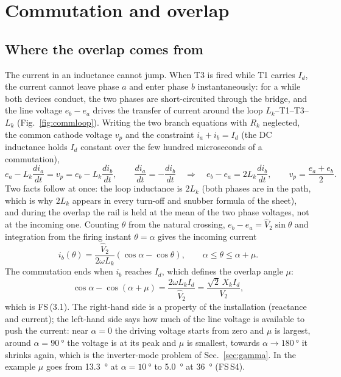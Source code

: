 \documentclass[10pt,a4paper]{scrartcl}
\newcommand{\Id}{I_{d}}
\newcommand{\Vll}{V_{2}}
\newcommand{\Xk}{X_{k}}
\newcommand{\Lk}{L_{k}}
\newcommand{\Rk}{R_{k}}
\newcommand{\fs}[1]{\textsf{FS}\,(#1)}
\newcommand{\fsS}[1]{\textsf{FS}\,#1}
\begin{document}
\section{Commutation and overlap}\label{sec:overlap}
\subsection{Where the overlap comes from}
The current in an inductance cannot jump. When T3 is fired while T1 carries $\Id$, the current cannot leave phase $a$ and enter phase $b$ instantaneously: for a while both devices conduct, the two phases are short-circuited through the bridge, and the line voltage $e_b - e_a$ drives the transfer of current around the loop $\Lk$--T1--T3--$\Lk$ (Fig.~\ref{fig:commloop}). Writing the two branch equations with $\Rk$ neglected, the common cathode voltage $v_p$ and the constraint $i_a + i_b = \Id$ (the DC inductance holds $\Id$ constant over the few hundred microseconds of a commutation),
\begin{equation}
e_a - \Lk\frac{di_a}{dt} = v_p = e_b - \Lk\frac{di_b}{dt}, \qquad \frac{di_a}{dt} = -\frac{di_b}{dt}
\quad\Rightarrow\quad
e_b - e_a = 2\Lk\frac{di_b}{dt}, \qquad v_p = \frac{e_a+e_b}{2} .
\label{eq:commKVL}
\end{equation}
Two facts follow at once: the loop inductance is $2\Lk$ (both phases are in the path, which is why $2\Lk$ appears in every turn-off and snubber formula of the sheet), and during the overlap the rail is held at the mean of the two phase voltages, not at the incoming one. Counting $\theta$ from the natural crossing, $e_b - e_a = \hat V_2\sin\theta$ and integration from the firing instant $\theta = \alpha$ gives the incoming current
\begin{equation}
i_b(\theta) = \frac{\hat V_2}{2\omega\Lk}\left(\cos\alpha - \cos\theta\right), \qquad \alpha\le\theta\le\alpha+\mu .
\label{eq:ib}
\end{equation}
The commutation ends when $i_b$ reaches $\Id$, which defines the overlap angle $\mu$:
\begin{equation}
\cos\alpha - \cos(\alpha+\mu) = \frac{2\omega\Lk\Id}{\hat V_2} = \frac{\sqrt2\,\Xk\Id}{\Vll} ,
\label{eq:muderiv}
\end{equation}
which is \fs{3.1}. The right-hand side is a property of the installation (reactance and current); the left-hand side says how much of the line voltage is available to push the current: near $\alpha = 0$ the driving voltage starts from zero and $\mu$ is largest, around $\alpha = \SI{90}{\degree}$ the voltage is at its peak and $\mu$ is smallest, towards $\alpha\to\SI{180}{\degree}$ it shrinks again, which is the inverter-mode problem of Sec.~\ref{sec:gamma}. In the example $\mu$ goes from \SI{13.3}{\degree} at $\alpha = \SI{10}{\degree}$ to \SI{5.0}{\degree} at \SI{36}{\degree} (\fsS{S4}).
\end{document}
